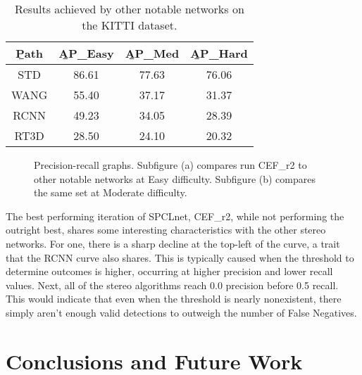 \begin{table}[ht]
	\centering
	\caption{Results achieved by other notable networks on the KITTI dataset.}
	\begin{tabular}{|c|c|c|c|}
		\hline
		\b{Path} & \b{AP\_Easy} & \b{AP\_Med} & \b{AP\_Hard} \\ \hline
		  STD    &    86.61     &    77.63    &    76.06     \\ \hline
		  WANG   &    55.40     &    37.17    &    31.37     \\ \hline
		  RCNN   &    49.23     &    34.05    &    28.39     \\ \hline
		  RT3D   &    28.50     &    24.10    &    20.32     \\ \hline
	\end{tabular}
	\label{fpnet_ap4}
\end{table}

\begin{figure}[H]
	\centering
	\caption{Precision-recall graphs. Subfigure (a) compares run CEF\_r2 to other notable networks at Easy  difficulty. Subfigure (b) compares the same set at Moderate difficulty.}
	\label{fpnet_pr4}
\end{figure}

The best performing iteration of SPCLnet, CEF\_r2, while not performing the outright best, shares some interesting characteristics with the other stereo networks. For one, there is a sharp decline at the top-left of the curve, a trait that the RCNN curve also shares. This is typically caused when the threshold to determine outcomes is higher, occurring at higher precision and lower recall values. Next, all of the stereo algorithms reach 0.0 precision before 0.5 recall. This would indicate that even when the threshold is nearly nonexistent, there simply aren't enough valid detections to outweigh the number of False Negatives. 

\newpage
\section{Conclusions and Future Work}
\label{sect_conclusions}

